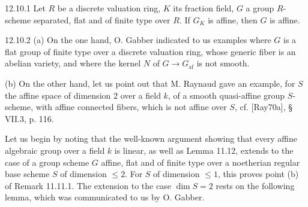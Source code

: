 \begin{corollary}{12.10.1}\label{VIB.12.10.1}
Let $R$ be a discrete valuation ring, $K$ its fraction field, $G$ a group $R$-scheme separated, flat and of finite type over $R$. If $G_K$ is affine, then $G$ is affine.
\end{corollary}

\begin{remarks}{12.10.2}\label{VIB.12.10.2}
(a) On the one hand, O. Gabber indicated to us examples where $G$ is a flat group of finite type over a discrete valuation ring, whose generic fiber is an abelian variety, and where the kernel $N$ of $G\to G_{\mathrm{af}}$ is not smooth.

(b) On the other hand, let us point out that M. Raynaud gave an example, for $S$ the affine space of dimension $2$ over a field $k$, of a smooth quasi-affine group $S$-scheme, with affine connected fibers, which is not affine over $S$, cf. [Ray70a], \S\,VII.3, p. 116.
\end{remarks}

 Let us begin by noting that the well-known argument showing that every affine algebraic group over a field $k$ is linear, as well as Lemma 11.12, extends to the case of a group scheme $G$ affine, flat and of finite type over a noetherian regular base scheme $S$ of dimension $\leq2$. For $S$ of dimension $\leq1$, this proves point (b) of Remark 11.11.1. The extension to the case $\dim S=2$ rests on the following lemma, which was communicated to us by O. Gabber.

